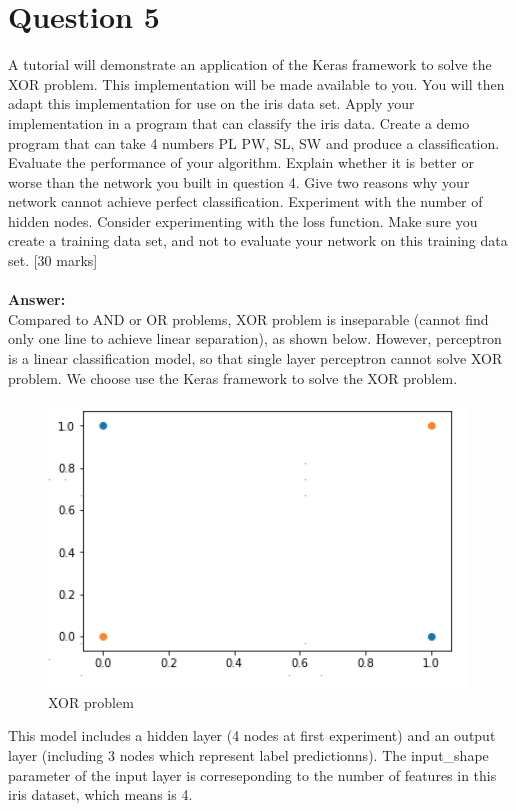 \documentclass{article}
\begin{document}
\section{Question 5}
A tutorial will demonstrate an application of the Keras framework to solve the XOR problem. This implementation will be made available to you. You will then adapt this implementation for use on the iris data set.
Apply your implementation in a program that can classify the iris data. Create a demo program that can take 4 numbers PL PW, SL, SW and produce a classification. Evaluate the performance of your algorithm. Explain whether it is better or worse than the network you built in question 4. Give two reasons why your network cannot achieve perfect classification.
Experiment with the number of hidden nodes. Consider experimenting with the loss function. Make sure you create a training data set, and not to evaluate your network on this training data set.
[30 marks]\\\\
\textbf{Answer:}\\
Compared to AND or OR problems, XOR problem is inseparable (cannot find only one line to achieve linear separation), as shown below. However, perceptron is a linear classification model, so that single layer perceptron cannot solve XOR problem. We choose use the Keras framework to solve the XOR problem.
\begin{figure}[H]
\centering
\includegraphics[scale=0.4]{./img/XOR.png}
\caption{XOR problem}
\end{figure}
\noindent
This model includes a hidden layer (4 nodes at first experiment) and an output layer (including 3 nodes which represent label predictionns). The input\_shape parameter of the input layer is correseponding to the number of features in this iris dataset, which means is 4.\\
\end{document}
